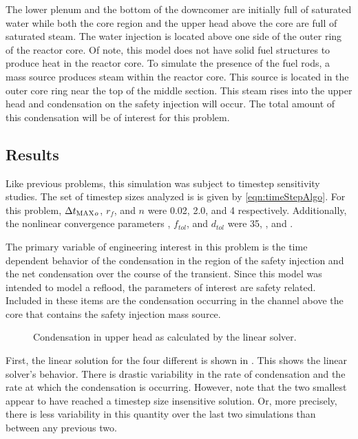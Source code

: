 The lower plenum and the bottom of the downcomer are initially full of saturated water while both the core region and the upper head above the core are full of saturated steam.
The water injection is located above one side of the outer ring of the reactor core.
Of note, this model does not have solid fuel structures to produce heat in the reactor core.
To simulate the presence of the fuel rods, a mass source produces steam within the reactor core.
This source is located in the outer core ring near the top of the middle section.
This steam rises into the upper head and condensation on the safety injection will occur.
The total amount of this condensation will be of interest for this problem.

\subsection{Results}
\label{sect:refloodResults}

Like previous problems, this simulation was subject to timestep sensitivity studies.
The set of timestep sizes analyzed is is given by \eqref{eqn:timeStepAlgo}.
For this problem, $\dtmax{}_{o}$, $r_{f}$, and ${n}$ were 0.02, 2.0, and 4 respectively.
Additionally, the nonlinear convergence parameters \kmax{}, $f_{tol}$, and $d_{tol}$ were 35, , and .

The primary variable of engineering interest in this problem is the time dependent behavior of the condensation in the region of the safety injection and the net condensation over the course of the transient.
Since this model was intended to model a reflood, the parameters of interest are safety related.
Included in these items are the condensation occurring in the channel above the core that contains the safety injection mass source.

\begin{figure}[h!t]
\centering

\caption{Condensation in upper head as calculated by the linear solver.}
\label{fig:refloodGammaLin}
\end{figure}

First, the linear solution for the four different \dtmax{} is shown in .
This shows the linear solver's behavior.
There is drastic variability in the rate of condensation and the rate at which the condensation is occurring.
However, note that the two smallest \dtmax{} appear to have reached a timestep size insensitive solution.
Or, more precisely, there is less variability in this quantity over the last two simulations than between any previous two.

